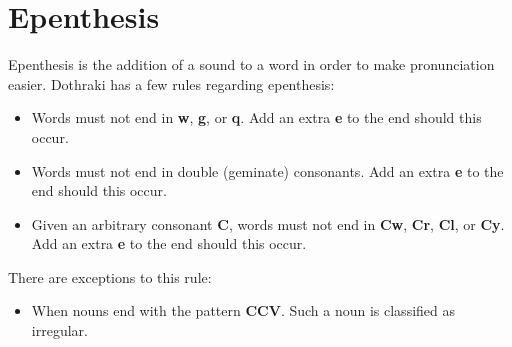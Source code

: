 \section*{Epenthesis}
Epenthesis is the addition of a sound to a word in order to make pronunciation
easier. Dothraki has a few rules regarding epenthesis:
\begin{itemize}
	\item Words must not end in \textbf{w}, \textbf{g}, or \textbf{q}. Add an extra \textbf{e} to the
				end should this occur.
	\item Words must not end in double (geminate) consonants.
        Add an extra \textbf{e} to the end should this occur.
	\item Given an arbitrary consonant \textbf{C}, words must not end in
				\textbf{Cw}, \textbf{Cr}, \textbf{Cl}, or \textbf{Cy}.
				Add an extra \textbf{e} to the end should this occur.
\end{itemize}
There are exceptions to this rule:
\begin{itemize}
	\item When nouns end with the pattern \textbf{CCV}. Such a noun is classified as
				irregular.
\end{itemize}
